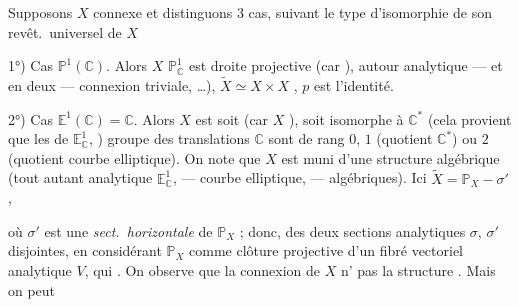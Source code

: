 \documentclass[11pt,a4paper]{article}
\begin{document}

Supposons $X$ connexe et distinguons  3 cas, suivant le type d'isomorphie de son revêt.\ universel de $X$

1°) Cas  $\mathbb{P}^{1}(\mathbb{C})$. Alors $X$ \struck{$\simeq$} $\mathbb{P}^{1}_{\mathbb{C}}$ est  droite projective (car ),  autour analytique — et en deux \ill{} \ill{} — \ill{} \ill{} connexion triviale, \ill{} \ill{} …), $\widetilde{X} \simeq X \times X$ , $p$ est l'identité.

2°) Cas $\mathbb{E}^{1}(\mathbb{C}) = \mathbb{C}$. Alors $X$ est soit   (car $X$ ), soit isomorphe à $\mathbb{C}^{*}$ (cela provient  que les    \ill{} de $\mathbb{E}^{1}_{\mathbb{C}}$, )     groupe des translations $\mathbb{C}$ sont de rang $0$, $1$ (quotient $\mathbb{C}^{*}$) ou $2$ (quotient courbe elliptique). On note que $X$ est muni d'une structure algébrique (tout autant analytique  $\mathbb{E}^{1}_{\mathbb{C}}$, —  courbe elliptique, —  algébriques). Ici $\widetilde{X} = \mathbb{P}_X - \sigma'$,

où $\sigma'$ est une \emph{sect.\ horizontale} de $\mathbb{P}_X$ ; donc,   des deux sections analytiques $\sigma$, $\sigma'$ disjointes, en considérant $\mathbb{P}_X$ comme clôture projective d'un fibré vectoriel analytique $V$, qui   \struck{\ill{} \ill{}} . On observe que la connexion de $X$ \struck{\ill{}} n' pas la structure . Mais on peut
\end{document}

